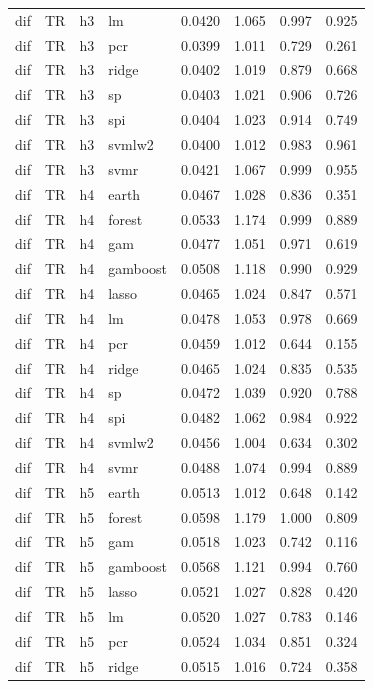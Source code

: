 \begin{ThreePartTable}
\begin{longtable}[t]{llclcccc}
dif & TR & h3 & lm & 0.0420 & 1.065 & 0.997 & 0.925\\
dif & TR & h3 & pcr & 0.0399 & 1.011 & 0.729 & 0.261\\
dif & TR & h3 & ridge & 0.0402 & 1.019 & 0.879 & 0.668\\
dif & TR & h3 & sp & 0.0403 & 1.021 & 0.906 & 0.726\\
dif & TR & h3 & spi & 0.0404 & 1.023 & 0.914 & 0.749\\
dif & TR & h3 & svmlw2 & 0.0400 & 1.012 & 0.983 & 0.961\\
dif & TR & h3 & svmr & 0.0421 & 1.067 & 0.999 & 0.955\\
\addlinespace
dif & TR & h4 & earth & 0.0467 & 1.028 & 0.836 & 0.351\\
dif & TR & h4 & forest & 0.0533 & 1.174 & 0.999 & 0.889\\
dif & TR & h4 & gam & 0.0477 & 1.051 & 0.971 & 0.619\\
dif & TR & h4 & gamboost & 0.0508 & 1.118 & 0.990 & 0.929\\
dif & TR & h4 & lasso & 0.0465 & 1.024 & 0.847 & 0.571\\
dif & TR & h4 & lm & 0.0478 & 1.053 & 0.978 & 0.669\\
dif & TR & h4 & pcr & 0.0459 & 1.012 & 0.644 & 0.155\\
dif & TR & h4 & ridge & 0.0465 & 1.024 & 0.835 & 0.535\\
dif & TR & h4 & sp & 0.0472 & 1.039 & 0.920 & 0.788\\
dif & TR & h4 & spi & 0.0482 & 1.062 & 0.984 & 0.922\\
dif & TR & h4 & svmlw2 & 0.0456 & 1.004 & 0.634 & 0.302\\
dif & TR & h4 & svmr & 0.0488 & 1.074 & 0.994 & 0.889\\
\addlinespace
dif & TR & h5 & earth & 0.0513 & 1.012 & 0.648 & 0.142\\
dif & TR & h5 & forest & 0.0598 & 1.179 & 1.000 & 0.809\\
dif & TR & h5 & gam & 0.0518 & 1.023 & 0.742 & 0.116\\
dif & TR & h5 & gamboost & 0.0568 & 1.121 & 0.994 & 0.760\\
dif & TR & h5 & lasso & 0.0521 & 1.027 & 0.828 & 0.420\\
dif & TR & h5 & lm & 0.0520 & 1.027 & 0.783 & 0.146\\
dif & TR & h5 & pcr & 0.0524 & 1.034 & 0.851 & 0.324\\
dif & TR & h5 & ridge & 0.0515 & 1.016 & 0.724 & 0.358\\

\end{longtable}
\end{ThreePartTable}
